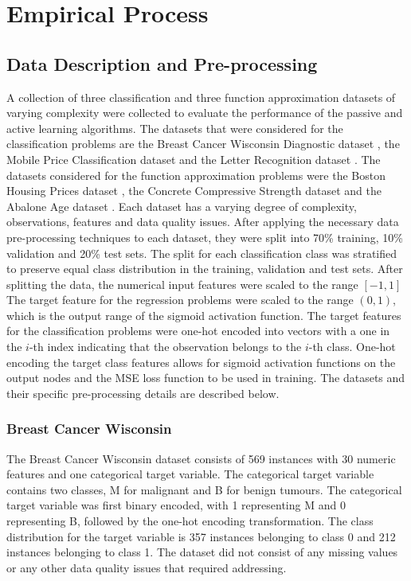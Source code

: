 \documentclass[conference]{IEEEtran}
\begin{document}
	\section{Empirical Process}\label{EP}
	\subsection{Data Description and Pre-processing}
	A collection of three classification and three function approximation datasets of varying complexity were collected to evaluate the performance of the passive and active learning algorithms. The datasets that were considered for the classification problems are the Breast Cancer Wisconsin Diagnostic dataset \cite{breast}, the Mobile Price Classification dataset \cite{mobile} and the Letter Recognition dataset \cite{letter}. The datasets considered for the function approximation problems were the Boston Housing Prices dataset \cite{boston}, the Concrete Compressive Strength dataset \cite{concrete} and the Abalone Age dataset \cite{abalone}. Each dataset has a varying degree of complexity, observations, features and data quality issues. After applying the necessary data pre-processing techniques to each dataset, they were split into 70\% training, 10\% validation and 20\% test sets. The split for each classification class was stratified to preserve equal class distribution in the training, validation and test sets. After splitting the data, the numerical input features were scaled to the range $[-1, 1]$ The target feature for the regression problems were scaled to the range $(0, 1)$, which is the output range of the sigmoid activation function. The target features for the classification problems were one-hot encoded into vectors with a one in the $i$-th index indicating that the observation belongs to the $i$-th class. One-hot encoding the target class features allows for sigmoid activation functions on the output nodes and the MSE loss function to be used in training. The datasets and their specific pre-processing details are described below.
	
	\subsubsection{Breast Cancer Wisconsin}
	The Breast Cancer Wisconsin dataset consists of 569 instances with 30 numeric features and one categorical target variable. The categorical target variable contains two classes, M for malignant and B for benign tumours. The categorical target variable was first binary encoded, with 1 representing M and 0 representing B, followed by the one-hot encoding transformation. The class distribution for the target variable is 357 instances belonging to class 0 and 212 instances belonging to class 1. The dataset did not consist of any missing values or any other data quality issues that required addressing.
	
\end{document}
